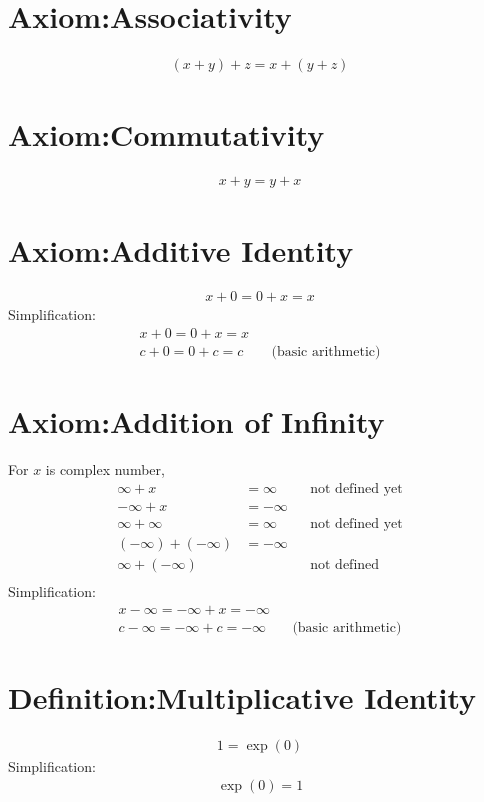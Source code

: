 \documentclass[12pt,a4paper]{report}
\begin{document}
\section{Axiom:Associativity}
\label{Axiom:Associativity}
\begin{align*}
(x+y)+z = x+(y+z)
\end{align*}

\section{Axiom:Commutativity}
\label{Axiom:Commutativity}
\begin{align*}
x+y = y+x
\end{align*}

\section{Axiom:Additive Identity}
\label{Axiom:Additive_Identity}
\begin{align*}
x+0 = 0+x = x
\end{align*}
Simplification:
\begin{align*}
x+0 = 0+x = x \\
c+0 = 0+c = c && \text{(basic arithmetic)}
\end{align*}

\section{Axiom:Addition of Infinity}
\label{Axiom:Addition_of_Infinity}
For $x$ is complex number,
\begin{align*}
\infty + x &= \infty && \text{not defined yet} \\
-\infty + x &= -\infty \\
\infty + \infty &= \infty && \text{not defined yet} \\
(-\infty) + (-\infty) &= -\infty \\
\infty + (-\infty) &&& \text{not defined} \\
\end{align*}
Simplification:
\begin{align*}
x-\infty = -\infty+x = -\infty \\
c-\infty = -\infty+c = -\infty && \text{(basic arithmetic)}
\end{align*}

\section{Definition:Multiplicative Identity}
\label{Definition:Multiplicative_Identity}
\begin{align*}
1 = \exp (0)
\end{align*}
Simplification:
\begin{align*}
\exp (0) = 1
\end{align*}
\end{document}
